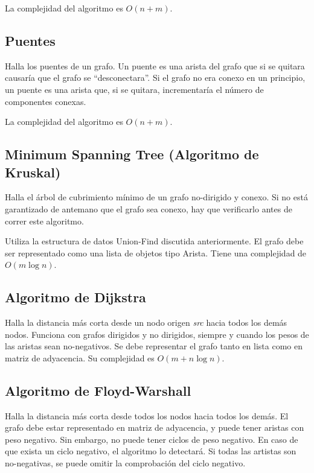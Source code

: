 \documentclass{article}
\begin{document}
\begin{multicols}{2}
	La complejidad del algoritmo es \( O(n + m) \).
	
	
	\subsection{Puentes}
	Halla los puentes de un grafo.  Un puente es una arista del grafo que si se quitara causaría que el grafo se ``desconectara''. Si el grafo no era conexo en un principio, un puente es una arista que, si se quitara, incrementaría el número de componentes conexas.
	
	La complejidad del algoritmo es \( O(n + m) \).
	
	
	\subsection{Minimum Spanning Tree (Algoritmo de Kruskal)}
	Halla el árbol de cubrimiento mínimo de un grafo no-dirigido y conexo. Si no está garantizado de antemano que el grafo sea conexo, hay que verificarlo antes de correr este algoritmo. 
		
	Utiliza la estructura de datos Union-Find discutida anteriormente. El grafo debe ser representado como una lista de objetos tipo Arista. Tiene una complejidad de \( O( m \log n) \).	
	
	
	\subsection{Algoritmo de Dijkstra}
	Halla la distancia más corta desde un nodo origen \emph{src} hacia todos los demás nodos. Funciona con grafos dirigidos y no dirigidos, siempre y cuando los pesos de las aristas sean no-negativos. Se debe representar el grafo tanto en lista como en matriz de adyacencia. Su complejidad es \( O(m + n \log n) \).
	
	
	\subsection{Algoritmo de Floyd-Warshall}
	Halla la distancia más corta desde todos los nodos hacia todos los demás. El grafo debe estar representado en matriz de adyacencia, y puede tener aristas con peso negativo. Sin embargo, no puede tener ciclos de peso negativo. En caso de que exista un ciclo negativo, el algoritmo lo detectará. Si todas las artistas son no-negativas, se puede omitir la comprobación del ciclo negativo.
	

\end{multicols}
\end{document}
